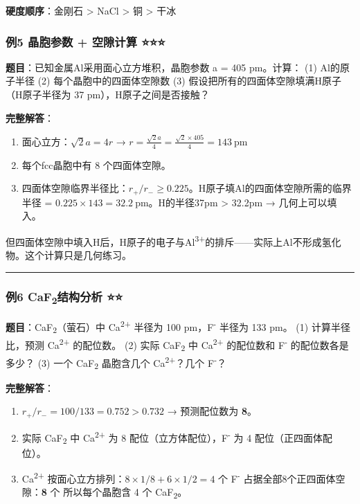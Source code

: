 \documentclass[a4paper,11pt]{ctexart}
\begin{document}
\textbf{硬度顺序}：金刚石 \textgreater{} NaCl \textgreater{} 铜 \textgreater{} 干冰

\subsubsection{例5 晶胞参数 + 空隙计算 ⭐⭐⭐}\label{ux4f8b5-ux6676ux80deux53c2ux6570-ux7a7aux9699ux8ba1ux7b97}

\textbf{题目}：已知金属Al采用面心立方堆积，晶胞参数 a = 405 pm。计算：
(1) Al的原子半径
(2) 每个晶胞中的四面体空隙数
(3) 假设把所有的四面体空隙填满H原子（H原子半径为 37 pm），H原子之间是否接触？

\textbf{完整解答}：

\begin{enumerate}
\def\labelenumi{(\arabic{enumi})}
\item
  面心立方：\(\sqrt{2}a = 4r\) → \(r = \frac{\sqrt{2}a}{4} = \frac{\sqrt{2} \times 405}{4} = 143\ \mathrm{pm}\)
\item
  每个fcc晶胞中有 8 个四面体空隙。
\item
  四面体空隙临界半径比：\(r_+/r_- \geq 0.225\)。H原子填Al的四面体空隙所需的临界半径 = \(0.225 \times 143 = 32.2\ \mathrm{pm}\)。H的半径37pm \textgreater{} 32.2pm → 几何上可以填入。
\end{enumerate}

但四面体空隙中填入H后，H原子的电子与Al\textsuperscript{3+}的排斥------实际上Al不形成氢化物。这个计算只是几何练习。

\begin{center}\rule{0.5\linewidth}{0.5pt}\end{center}

\subsubsection{\texorpdfstring{例6 CaF\textsubscript{2}结构分析 ⭐⭐}{例6 CaF2结构分析 ⭐⭐}}\label{ux4f8b6-caf2ux7ed3ux6784ux5206ux6790}

\textbf{题目}：CaF\textsubscript{2}（萤石）中 Ca\textsuperscript{2+} 半径为 100 pm，F\textsuperscript{-} 半径为 133 pm。
(1) 计算半径比，预测 Ca\textsuperscript{2+} 的配位数。
(2) 实际 CaF\textsubscript{2} 中 Ca\textsuperscript{2+} 的配位数和 F\textsuperscript{-} 的配位数各是多少？
(3) 一个 CaF\textsubscript{2} 晶胞含几个 Ca\textsuperscript{2+}？几个 F\textsuperscript{-}？

\textbf{完整解答}：

\begin{enumerate}
\def\labelenumi{(\arabic{enumi})}
\item
  \(r_+/r_- = 100/133 = 0.752 > 0.732\) → 预测配位数为 \textbf{8}。
\item
  实际 CaF\textsubscript{2} 中 Ca\textsuperscript{2+} 为 8 配位（立方体配位），F\textsuperscript{-} 为 4 配位（正四面体配位）。
\item
  Ca\textsuperscript{2+} 按面心立方排列：\(8 \times 1/8 + 6 \times 1/2 = 4\) 个
  F\textsuperscript{-} 占据全部8个正四面体空隙：\textbf{8} 个
  所以每个晶胞含 4 个 CaF\textsubscript{2}。
\end{enumerate}
\end{document}
